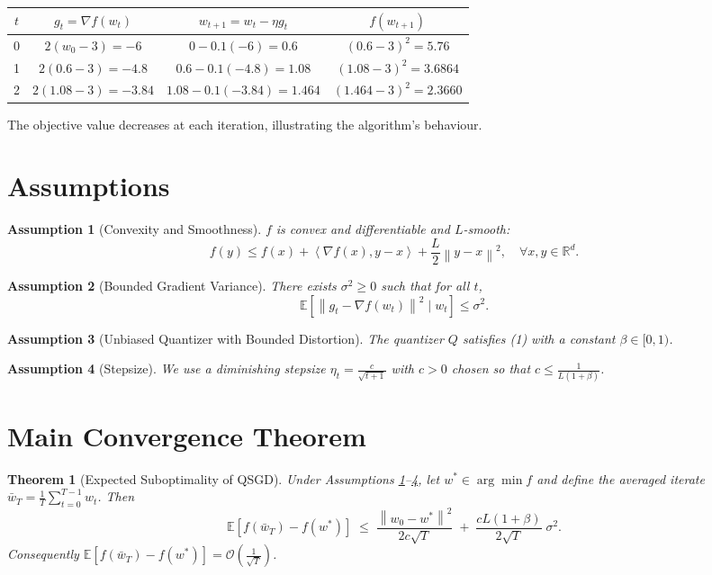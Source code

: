 \documentclass{article}
\newtheorem{theorem}{Theorem}
\newtheorem{assumption}{Assumption}
\newcommand{\E}{\mathbb{E}}
\newcommand{\R}{\mathbb{R}}
\newcommand{\norm}[1]{\left\|#1\right\|}
\newcommand{\iprod}[2]{\left\langle #1,#2\right\rangle}
\begin{document}
\begin{center}
\begin{tabular}{c|c|c|c}
$t$ & $g_t=\nabla f(w_t)$ & $w_{t+1}=w_t-\eta g_t$ & $f(w_{t+1})$\\ \hline
0 & $2(w_0-3)=-6$ & $0-0.1(-6)=0.6$ & $(0.6-3)^2=5.76$\\
1 & $2(0.6-3)=-4.8$ & $0.6-0.1(-4.8)=1.08$ & $(1.08-3)^2=3.6864$\\
2 & $2(1.08-3)=-3.84$ & $1.08-0.1(-3.84)=1.464$ & $(1.464-3)^2=2.3660$\\
\end{tabular}
\end{center}
The objective value decreases at each iteration, illustrating the algorithm’s behaviour.

\newpage
\section*{Assumptions}
\begin{assumption}[Convexity and Smoothness]\label{asm:convex}
$f$ is convex and differentiable and $L$-smooth:
\[
f(y)\le f(x)+\iprod{\nabla f(x)}{y-x}+\frac{L}{2}\norm{y-x}^{2},
\quad\forall x,y\in\R^{d}.
\]
\end{assumption}
\begin{assumption}[Bounded Gradient Variance]\label{asm:variance}
There exists $\sigma^{2}\ge0$ such that for all $t$,
\[
\E\!\left[\norm{g_t-\nabla f(w_t)}^{2}\mid w_t\right]\le\sigma^{2}.
\]
\end{assumption}
\begin{assumption}[Unbiased Quantizer with Bounded Distortion]\label{asm:quant}
The quantizer $Q$ satisfies (1) with a constant $\beta\in[0,1)$.
\end{assumption}
\begin{assumption}[Stepsize]\label{asm:stepsize}
We use a diminishing stepsize $\eta_t=\frac{c}{\sqrt{t+1}}$ with $c>0$ chosen so that $c\le\frac{1}{L(1+\beta)}$.
\end{assumption}

\section*{Main Convergence Theorem}
\begin{theorem}[Expected Suboptimality of QSGD]\label{thm:main}
Under Assumptions \ref{asm:convex}–\ref{asm:stepsize}, let $w^{*}\in\arg\min f$ and define the averaged iterate $\bar w_T=\frac{1}{T}\sum_{t=0}^{T-1} w_t$. Then
\[
\E\!\left[f(\bar w_T)-f(w^{*})\right]\;\le\;
\frac{\norm{w_0-w^{*}}^{2}}{2c\sqrt{T}}
\;+\;
\frac{cL(1+\beta)}{2\sqrt{T}}\;\sigma^{2}.
\tag{3}
\]
Consequently $\E[f(\bar w_T)-f(w^{*})]=\mathcal O\!\left(\frac{1}{\sqrt{T}}\right)$.
\end{theorem}
\end{document}
